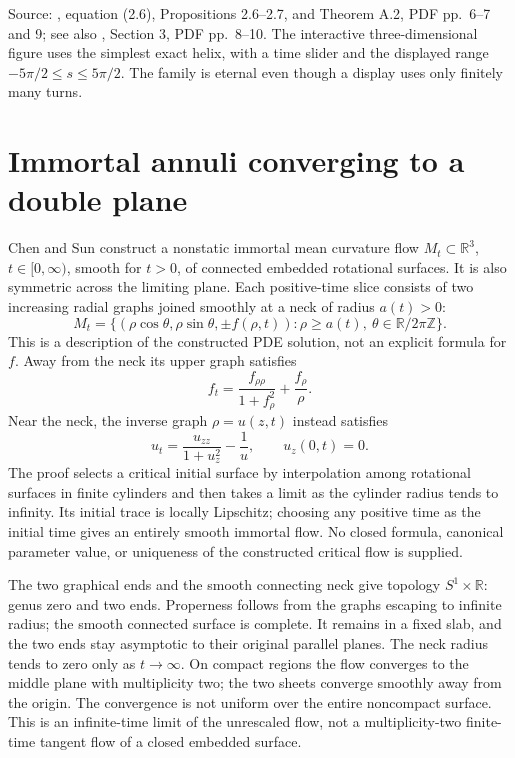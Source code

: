 \begin{example}
Source: \cite{CatSS19}, equation (2.6), Propositions 2.6--2.7, and Theorem A.2, PDF pp.~6--7 and 9; see also \cite{CatAAAW13}, Section 3, PDF pp.~8--10. The interactive three-dimensional figure uses the simplest exact helix, with a time slider and the displayed range $-5\pi/2\leq s\leq5\pi/2$. The family is eternal even though a display uses only finitely many turns.
\end{example}

\chapter{Immortal annuli converging to a double plane}\label{sec:catalogue-double-plane-flow}
\begin{example}\label{ex:catalogue-double-plane-flow}
Chen and Sun construct a nonstatic immortal mean curvature flow $M_t\subset\mathbb R^3$, $t\in[0,\infty)$, smooth for $t>0$, of connected embedded rotational surfaces. It is also symmetric across the limiting plane. Each positive-time slice consists of two increasing radial graphs joined smoothly at a neck of radius $a(t)>0$:
\[
 M_t=\{(\rho\cos\theta,\rho\sin\theta,\pm f(\rho,t)):
 \rho\geq a(t),\ \theta\in\mathbb R/2\pi\mathbb Z\}.
\]
This is a description of the constructed PDE solution, not an explicit formula for $f$. Away from the neck its upper graph satisfies
\[
 f_t=\frac{f_{\rho\rho}}{1+f_\rho^2}+\frac{f_\rho}{\rho}.
\]
Near the neck, the inverse graph $\rho=u(z,t)$ instead satisfies
\[
 u_t=\frac{u_{zz}}{1+u_z^2}-\frac1u,\qquad u_z(0,t)=0.
\]
The proof selects a critical initial surface by interpolation among rotational surfaces in finite cylinders and then takes a limit as the cylinder radius tends to infinity. Its initial trace is locally Lipschitz; choosing any positive time as the initial time gives an entirely smooth immortal flow. No closed formula, canonical parameter value, or uniqueness of the constructed critical flow is supplied.

The two graphical ends and the smooth connecting neck give topology $S^1\times\mathbb R$: genus zero and two ends. Properness follows from the graphs escaping to infinite radius; the smooth connected surface is complete. It remains in a fixed slab, and the two ends stay asymptotic to their original parallel planes. The neck radius tends to zero only as $t\to\infty$. On compact regions the flow converges to the middle plane with multiplicity two; the two sheets converge smoothly away from the origin. The convergence is not uniform over the entire noncompact surface. This is an infinite-time limit of the unrescaled flow, not a multiplicity-two finite-time tangent flow of a closed embedded surface.


\end{example}
